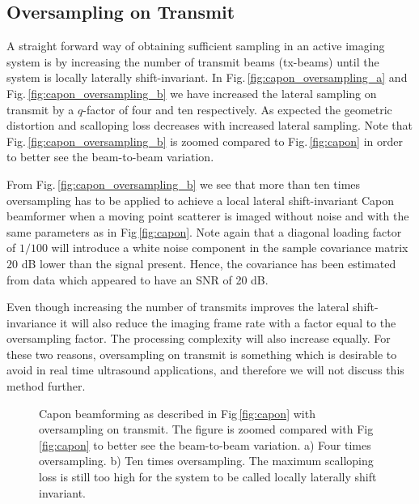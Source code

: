 \documentclass[journal]{IEEEtran}
\newcommand{\img}{img/}
\begin{document}
\subsection{Oversampling on Transmit}
A straight forward way of obtaining sufficient sampling in an active imaging system is by increasing the number of transmit beams (tx-beams) until the system is locally laterally shift-invariant. In Fig.\,\ref{fig:capon_oversampling_a} and Fig.\,\ref{fig:capon_oversampling_b} we have increased the lateral sampling on transmit by a $q$-factor of four and ten respectively. As expected the geometric distortion and scalloping loss decreases with increased lateral sampling. Note that Fig.\,\ref{fig:capon_oversampling_b} is zoomed compared to Fig.\,\ref{fig:capon} in order to better see the beam-to-beam variation.

From Fig.\,\ref{fig:capon_oversampling_b} we see that more than ten times oversampling has to be applied to achieve a local lateral shift-invariant Capon beamformer when a moving point scatterer is imaged without noise and with the same parameters as in Fig\,\ref{fig:capon}. %
Note again that a diagonal loading factor of $1/100$ will introduce a white noise component in the sample covariance matrix $20$ dB lower than the signal present. Hence, the covariance has been estimated from data which appeared to have an SNR of 20 dB.

Even though increasing the number of transmits improves the lateral shift-invariance it will also reduce the imaging frame rate with a factor equal to the oversampling factor. The processing complexity will also increase equally. For these two reasons, oversampling on transmit is something which is desirable to avoid in real time ultrasound applications, and therefore we will not discuss this method further.

\begin{figure}[!t]
\centerline{
}
\caption{Capon beamforming as described in Fig\,\ref{fig:capon} with oversampling on transmit. The figure is zoomed compared with Fig\,\ref{fig:capon} to better see the beam-to-beam variation. a) Four times oversampling. b) Ten times oversampling. The maximum scalloping loss is still too high for the system to be called locally laterally shift invariant.}
\label{fig:capon_oversampling}
\end{figure}
\end{document}

